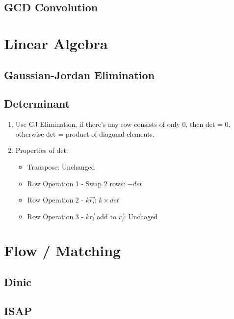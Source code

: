 \documentclass[a4paper,10pt,twocolumn,oneside]{article}
\begin{document}
\subsection{GCD Convolution}



\section{Linear Algebra}

\subsection{Gaussian-Jordan Elimination}


\subsection{Determinant}
{\normalsize
\noindent
\begin{enumerate}
\item Use GJ Elimination, if there's any row consists of only 0, then det = 0, otherwise det = product of diagonal elements.
\item Properties of det:
\begin{itemize}
    \item Transpose: Unchanged
    \item Row Operation 1 - Swap 2 rows: $-det$
    \item Row Operation 2 - $k \overrightarrow{r_i}$: $k \times det$
    \item Row Operation 3 - $k \overrightarrow{r_i}$ add to  $\overrightarrow{r_j}$: Unchaged
\end{itemize}
\end{enumerate}
}

\section{Flow / Matching}

\subsection{Dinic}


\subsection{ISAP}

\end{document}
